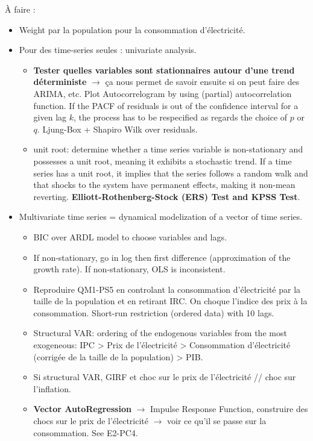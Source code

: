 
À faire : 
\begin{itemize}
\item Weight par la population pour la consommation d'électricité.
\item Pour des time-series seules : univariate analysis.
    \begin{itemize}
        \item \textbf{Tester quelles variables sont stationnaires autour d'une trend déterministe} $\to$ ça nous permet de savoir ensuite si on peut faire des ARIMA, etc. Plot Autocorrelogram by using (partial) autocorrelation function. If the PACF of residuals is out of the confidence interval for a given lag $k$, the process has to be respecified as regards the choice of $p$ or $q$. Ljung-Box + Shapiro Wilk over residuals.
        \item unit root: determine whether a time series variable is non-stationary and possesses a unit root, meaning it exhibits a stochastic trend. If a time series has a unit root, it implies that the series follows a random walk and that shocks to the system have permanent effects, making it non-mean reverting. \textbf{Elliott-Rothenberg-Stock (ERS) Test and KPSS Test}.
    \end{itemize}
\item Multivariate time series = dynamical modelization of a vector of
time series. 
\begin{itemize}
    \item BIC over ARDL model to choose variables and lags.
    \item If non-stationary, go in log then first difference (approximation of the growth rate). If non-stationary, OLS is inconsistent.
    \item Reproduire QM1-PS5 en controlant la consommation d'électricité par la taille de la population et en retirant IRC. On choque l'indice des prix à la consommation. Short-run restriction (ordered data) with 10 lags.
    \item Structural VAR: ordering of the endogenous variables from the most
    exogeneous: IPC > Prix de l'électricité > Consommation d'électricité (corrigée de la taille de la population) > PIB.
    \item Si structural VAR, GIRF et choc sur le prix de l'électricité // choc sur l'inflation.
    \item \textbf{Vector AutoRegression} $\to$ Impulse Response Function, construire des chocs sur le prix de l'électricité $\to$ voir ce qu'il se passe sur la consommation. See E2-PC4.

\end{itemize}
\end{itemize}
